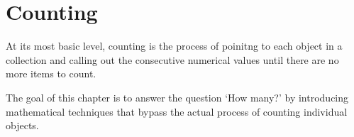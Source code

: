 
\part{Counting}

At its most basic level, counting is the process of poinitng to each object in a collection and calling out the consecutive numerical values until there are no more items to count. 

The goal of this chapter is to answer the question `How many?' by introducing mathematical techniques that bypass the actual process of counting individual objects. 




